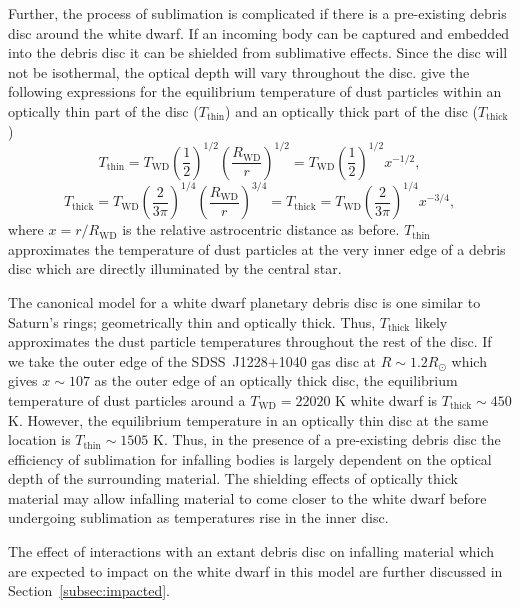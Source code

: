\documentclass[fleqn,usenatbib]{mnras}
\begin{document}
Further, the process of sublimation is complicated if there is a pre-existing debris disc around the white dwarf. 
If an incoming body can be captured and embedded into the debris disc \citep{Grishin2019, OConnor2020, Malamud2021} it can be shielded from sublimative effects.
Since the disc will not be isothermal, the optical depth will vary throughout the disc. 
\cite{Rafikov2012} give the following expressions for the equilibrium temperature of dust particles within an optically thin part of the disc ($T_\text{thin}$) and an optically thick part of the disc ($T_\text{thick}$)
\begin{equation}
    \label{eq:T_thin}
    T_\text{thin} = T_\text{WD} \left( \frac{1}{2} \right)^{1/2} \left( \frac{R_\text{WD}}{r}\right)^{1/2} = T_\text{WD} \left( \frac{1}{2} \right)^{1/2} x^{-1/2},
\end{equation}
\begin{equation}
    \label{eq:T_thick}
    T_\text{thick} = T_\text{WD} \left( \frac{2}{3 \pi} \right)^{1/4} \left( \frac{R_\text{WD}}{r} \right)^{3/4} = T_\text{thick} = T_\text{WD} \left( \frac{2}{3 \pi} \right)^{1/4} x^{-3/4},
\end{equation}
where $x = r/R_\text{WD}$ is the relative astrocentric distance as before. 
$T_\text{thin}$ approximates the temperature of dust particles at the very inner edge of a debris disc which are directly illuminated by the central star.

The canonical model for a white dwarf planetary debris disc is one similar to Saturn's rings; geometrically thin and optically thick.
Thus, $T_\text{thick}$ likely approximates the dust particle temperatures throughout the rest of the disc. 
If we take the outer edge of the SDSS~J1228+1040 gas disc at $R \sim 1.2 R_\odot$ which gives $x \sim 107$ as the outer edge of an optically thick disc, the equilibrium temperature of dust particles around a $T_\text{WD} = 22020$ K white dwarf is $T_\text{thick} \sim 450$ 
K. 
However, the equilibrium temperature in an optically thin disc at the same location is $T_\text{thin} \sim 1505$ K.
Thus, in the presence of a pre-existing debris disc the efficiency of sublimation for infalling bodies is largely dependent on the optical depth of the surrounding material. 
The shielding effects of optically thick material may allow infalling material to come closer to the white dwarf before undergoing sublimation as temperatures rise in the inner disc.

The effect of interactions with an extant debris disc on infalling material which are expected to impact on the white dwarf in this model are further discussed in Section~\ref{subsec:impacted}.
\end{document}
